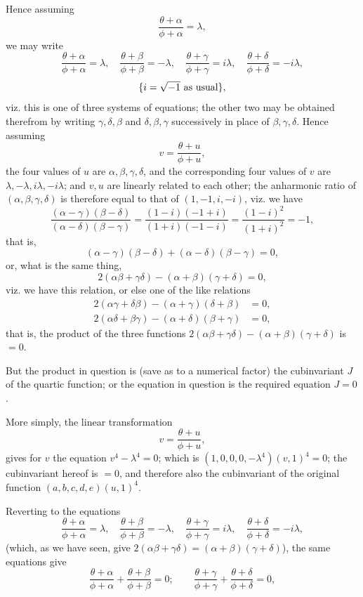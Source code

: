 \documentclass[11pt,a4paper]{article}
\theoremstyle{plain}
\theoremstyle{definition}
\begin{document}
\noindent
Hence assuming
\[
        \frac{\theta+\alpha}{\phi+\alpha}=\lambda,
\]
we may write
\[
\frac{\theta+\alpha}{\phi+\alpha}=\lambda,\quad
\frac{\theta+\beta}{\phi+\beta}=-\lambda,\quad
\frac{\theta+\gamma}{\phi+\gamma}=i\lambda,\quad
\frac{\theta+\delta}{\phi+\delta}=-i\lambda,
\]
\[
        \{i=\sqrt{-1}\hbox{ as usual}\},
\]
viz. this is one of three systems of equations; the other two may be obtained
therefrom by writing $\gamma,\delta,\beta$ and $\delta,\beta,\gamma$ successively
in place of $\beta,\gamma,\delta$. Hence assuming
\[
        v=\frac{\theta+u}{\phi+u},
\]
the four values of $u$ are $\alpha,\beta,\gamma,\delta$, and the corresponding four
values of $v$ are $\lambda,-\lambda,i\lambda,-i\lambda$; and $v,u$ are linearly
related to each other; the anharmonic ratio of $(\alpha,\beta,\gamma,\delta)$ is
therefore equal to that of $(1,-1,i,-i)$, viz. we have
\[
\frac{(\alpha-\gamma)(\beta-\delta)}
     {(\alpha-\delta)(\beta-\gamma)}
=
\frac{(1-i)(-1+i)}{(1+i)(-1-i)}
=\frac{(1-i)^2}{(1+i)^2}=-1,
\]
that is,
\[
        (\alpha-\gamma)(\beta-\delta)+(\alpha-\delta)(\beta-\gamma)=0,
\]
or, what is the same thing,
\[
        2(\alpha\beta+\gamma\delta)-(\alpha+\beta)(\gamma+\delta)=0,
\]
viz. we have this relation, or else one of the like relations
\[
\begin{split}
        2(\alpha\gamma+\delta\beta)-(\alpha+\gamma)(\delta+\beta)&=0,\\
        2(\alpha\delta+\beta\gamma)-(\alpha+\delta)(\beta+\gamma)&=0,
\end{split}
\]
that is, the product of the three functions
$2(\alpha\beta+\gamma\delta)-(\alpha+\beta)(\gamma+\delta)$ is $=0$.

But the product in question is (save as to a numerical factor) the cubinvariant $J$
of the quartic function; or the equation in question is the required equation $J=0$.

More simply, the linear transformation
\[
        v=\frac{\theta+u}{\phi+u},
\]
gives for $v$ the equation $v^4-\lambda^4=0$; which is
$(1,0,0,0,-\lambda^4)(v,1)^4=0$; the cubinvariant hereof is $=0$, and therefore
also the cubinvariant of the original function $(a,b,c,d,e)(u,1)^4$.

Reverting to the equations
\[
\frac{\theta+\alpha}{\phi+\alpha}=\lambda,\quad
\frac{\theta+\beta}{\phi+\beta}=-\lambda,\quad
\frac{\theta+\gamma}{\phi+\gamma}=i\lambda,\quad
\frac{\theta+\delta}{\phi+\delta}=-i\lambda,
\]
(which, as we have seen, give
$2(\alpha\beta+\gamma\delta)=(\alpha+\beta)(\gamma+\delta)$), the same equations
give
\[
\frac{\theta+\alpha}{\phi+\alpha}
+\frac{\theta+\beta}{\phi+\beta}=0;\qquad
\frac{\theta+\gamma}{\phi+\gamma}
+\frac{\theta+\delta}{\phi+\delta}=0,
\]
\clearpage
\end{document}

